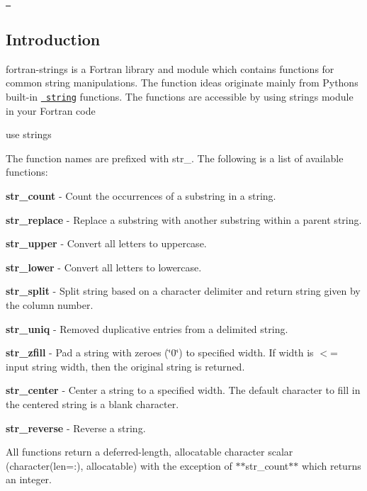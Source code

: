 \href{https://travis-ci.com/eengl/fortran-strings}{\texttt{ }}

\subsection*{Introduction}

fortran-\/strings is a Fortran library and module which contains functions for common string manipulations. The function ideas originate mainly from Python\textquotesingle{}s built-\/in \href{https://docs.python.org/3.7/library/stdtypes.html\#string-methods}{\texttt{ string}} functions. The functions are accessible by using {\ttfamily strings} module in your Fortran code

{\ttfamily use strings}

The function names are prefixed with {\ttfamily str\+\_\+}. The following is a list of available functions\+:


\begin{DoxyItemize}
\item {\bfseries{str\+\_\+count}} -\/ Count the occurrences of a substring in a string.
\item {\bfseries{str\+\_\+replace}} -\/ Replace a substring with another substring within a parent string.
\item {\bfseries{str\+\_\+upper}} -\/ Convert all letters to uppercase.
\item {\bfseries{str\+\_\+lower}} -\/ Convert all letters to lowercase.
\item {\bfseries{str\+\_\+split}} -\/ Split string based on a character delimiter and return string given by the column number.
\item {\bfseries{str\+\_\+uniq}} -\/ Removed duplicative entries from a delimited string.
\item {\bfseries{str\+\_\+zfill}} -\/ Pad a string with zeroes (\char`\"{}0\char`\"{}) to specified width. If width is $<$= input string width, then the original string is returned.
\item {\bfseries{str\+\_\+center}} -\/ Center a string to a specified width. The default character to fill in the centered string is a blank character.
\item {\bfseries{str\+\_\+reverse}} -\/ Reverse a string.
\end{DoxyItemize}

All functions return a deferred-\/length, allocatable character scalar ({\ttfamily character(len=\+:), allocatable}) with the exception of $\ast$$\ast${\ttfamily str\+\_\+count}$\ast$$\ast$ which returns an integer.

